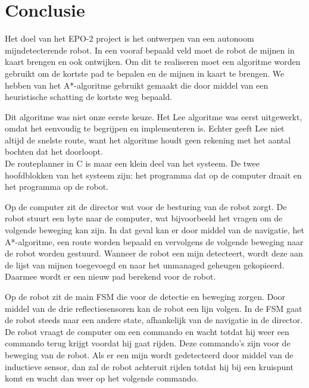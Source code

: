 \documentclass{report}
\begin{document}
\chapter{Conclusie}
\label{ch:conclusie}

Het doel van het EPO-2 project is het ontwerpen van een autonoom mijndetecterende robot. In een vooraf bepaald veld moet de robot de mijnen in kaart brengen en ook ontwijken. 
Om dit te realiseren moet een algoritme worden gebruikt om de kortste pad te bepalen en de mijnen in kaart te brengen. We hebben van het A*-algoritme gebruikt gemaakt die door middel van een heuristische schatting de kortste weg bepaald. 

Dit algoritme was niet onze eerste keuze. Het Lee algoritme was eerst uitgewerkt, omdat het eenvoudig te begrijpen en implementeren is. Echter geeft Lee niet altijd de snelste route, want het algoritme houdt geen rekening met het aantal bochten dat het doorloopt.\\

De routeplanner in C is maar een klein deel van het systeem. De twee hoofdblokken van het systeem zijn: het programma dat op de computer draait en het programma op de robot.  

Op de computer zit de director wat voor de besturing van de robot zorgt. De robot stuurt een byte naar de computer, wat bijvoorbeeld het vragen om de volgende beweging kan zijn. In dat geval kan er door middel van de navigatie, het A*-algoritme, een route worden bepaald en vervolgens de volgende beweging naar de robot worden gestuurd. Wanneer de robot een mijn detecteert, wordt deze aan de lijst van mijnen toegevoegd en naar het unmanaged geheugen gekopieerd. Daarmee wordt er een nieuw pad berekend voor de robot.

Op de robot zit de main FSM die voor de detectie en beweging zorgen. Door middel van de drie reflectiesensoren kan de robot een lijn volgen. In de FSM gaat de robot steeds naar een andere state, afhankelijk van de navigatie in de director. De robot vraagt de computer om een commando en wacht totdat hij weer een commando terug krijgt voordat hij gaat rijden. Deze commando's zijn voor de beweging van de robot. Als er een mijn wordt gedetecteerd door middel van de inductieve sensor, dan zal de robot achteruit rijden totdat hij bij een kruispunt komt en wacht dan weer op het volgende commando.
\end{document}
